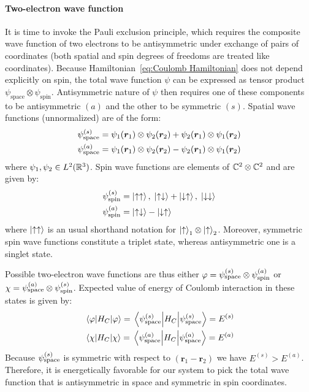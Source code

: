 \paragraph{Two-electron wave function}It is time to invoke the Pauli exclusion principle, which requires the composite wave function
of two electrons to be antisymmetric under exchange of pairs of coordinates (both spatial and
spin degrees of freedoms are treated like coordinates). Because 
Hamiltonian~\ref{eq:Coulomb Hamiltonian} does not depend explicitly on spin, the total
wave function \(\psi\) can be expressed as tensor product \(\psi_{\mathrm{space}} 
\otimes \psi_{\mathrm{spin}} \). Antisymmetric nature of \(\psi\) then requires one 
of these components to be antisymmetric \((a)\) and the other to be symmetric \((s)\). 
Spatial wave functions (unnormalized) are of the form:
\begin{align}
    &\psi_{\textrm{space}}^{(s)} = \psi_1(\bm{r}_1)\otimes \psi_2(\bm{r}_2) +
    \psi_2(\bm{r}_1)\otimes \psi_1(\bm{r}_2) \\
    &\psi_{\textrm{space}}^{(a)} = \psi_1(\bm{r}_1)\otimes \psi_2(\bm{r}_2) -
    \psi_2(\bm{r}_1)\otimes \psi_1(\bm{r}_2)
\end{align}
where \(\psi_1,\psi_2 \in L^2(\mathbb{R}^3)\). Spin wave functions are elements of \(\mathbb{C}^2 \otimes \mathbb{C}^2\)
and are given by:
\begin{align}
    &\psi_{\textrm{spin}}^{(s)} = \ket{\uparrow\uparrow},\; 
    \ket{\uparrow\downarrow} + \ket{\downarrow\uparrow},\; \ket{\downarrow\downarrow} \\
    &\psi_{\textrm{spin}}^{(a)} = \ket{\uparrow\downarrow}-\ket{\downarrow\uparrow}
\end{align}
where \(\ket{\uparrow\uparrow}\) is an usual shorthand notation for \(\ket{\uparrow}_1 \otimes
\ket{\uparrow}_2\). Moreover, symmetric spin wave functions
constitute a triplet state, whereas antisymmetric one is a singlet state. 

Possible two-electron wave functions are thus either \(\varphi=\psi_{\textrm{space}}^{(s)}
\otimes \psi_{\textrm{spin}}^{(a)}\) or \(\chi = \psi_{\textrm{space}}^{(a)}
\otimes \psi_{\textrm{spin}}^{(s)}\). Expected value of energy of Coulomb interaction 
in these states is given by:
\begin{align}
    &\expectationvalue{H_C}{\varphi} = \expectationvalue{H_C}{\spas} = E^{(s)}\\
    &\expectationvalue{H_C}{\chi} = \expectationvalue{H_C}{\spaa} = E^{(a)} 
\end{align}
Because \(\psi_{\textrm{space}}^{(s)}\) is symmetric with respect to \((\bm{r}_1-\bm{r}_2)\)
we have \(E^{(s)}>E^{(a)}\). Therefore, it is energetically
favorable for our system to pick the total wave function that is antisymmetric
in space and symmetric in spin coordinates.

